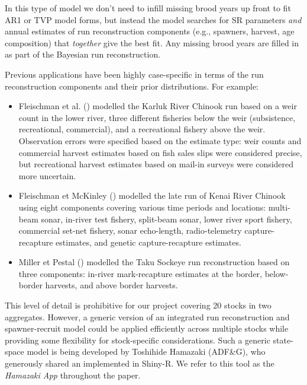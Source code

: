 \documentclass[french,11pt]{book}
\begin{document}
In this type of model we don't need to infill missing brood years up front to fit AR1 or TVP model forms, but instead the model searches for SR parameters \emph{and} annual estimates of run reconstruction components (e.g., spawners, harvest, age composition) that \emph{together} give the best fit. Any missing brood years are filled in as part of the Bayesian run reconstruction.

Previous applications have been highly case-specific in terms of the run reconstruction components and their prior distributions. For example:
\begin{itemize}

\item
  Fleischman et al. () modelled the Karluk River Chinook run based on a weir count in the lower river, three different fisheries below the weir (subsistence, recreational, commercial), and a recreational fishery above the weir. Observation errors were specified based on the estimate type: weir counts and commercial harvest estimates based on fish sales slips were considered precise, but recreational harvest estimates based on mail-in surveys were considered more uncertain.
\item
  Fleischman et McKinley () modelled the late run of Kenai River Chinook using eight components covering various time periods and locations: multi-beam sonar, in-river test fishery, split-beam sonar, lower river sport fishery, commercial set-net fishery, sonar echo-length, radio-telemetry capture-recapture estimates, and genetic capture-recapture estimates.
\item
  Miller et Pestal () modelled the Taku Sockeye run reconstruction based on three components: in-river mark-recapture estimates at the border, below-border harvests, and above border harvests.
\end{itemize}
This level of detail is prohibitive for our project covering 20 stocks in two aggregates. However, a generic version of an integrated run reconstruction and spawner-recruit model could be applied efficiently across multiple stocks while providing some flexibility for stock-specific considerations. Such a generic state-space model is being developed by Toshihide Hamazaki (ADF\&G), who generously shared an  implemented in Shiny-R. We refer to this tool as the \emph{Hamazaki App} throughout the paper.
\end{document}
